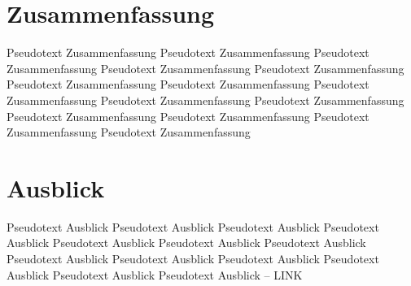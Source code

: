 \noindent
\begin{minipage}{\textwidth}
\chapter{Zusammenfassung}
\label{sec:Zusammenfassung}
Pseudotext Zusammenfassung Pseudotext Zusammenfassung Pseudotext Zusammenfassung Pseudotext Zusammenfassung Pseudotext Zusammenfassung Pseudotext Zusammenfassung Pseudotext Zusammenfassung Pseudotext Zusammenfassung Pseudotext Zusammenfassung Pseudotext Zusammenfassung Pseudotext Zusammenfassung Pseudotext Zusammenfassung Pseudotext Zusammenfassung Pseudotext Zusammenfassung 
\vspace{2.5cm}
\chapter{Ausblick}
\label{sec:Ausblick}
Pseudotext Ausblick Pseudotext Ausblick Pseudotext Ausblick Pseudotext Ausblick Pseudotext Ausblick Pseudotext Ausblick Pseudotext Ausblick Pseudotext Ausblick Pseudotext Ausblick Pseudotext Ausblick Pseudotext Ausblick Pseudotext Ausblick Pseudotext Ausblick -- LINK
\end{minipage}
